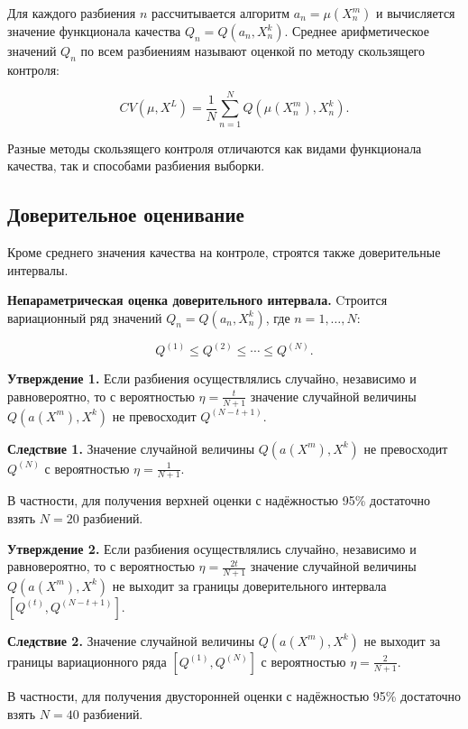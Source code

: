 Для каждого разбиения $n$ рассчитывается алгоритм $a_n = \mu(X^m_n)$ и вычисляется значение функционала качества $Q_n = Q(a_n, X^k_n)$. Среднее арифметическое значений $Q_n$ по всем разбиениям называют оценкой по методу скользящего контроля:

\[
CV(\mu, X^L) = \frac{1}{N} \sum_{n=1}^N Q(\mu(X^m_n), X^k_n).
\]

Разные методы скользящего контроля отличаются как видами функционала качества, так и способами разбиения выборки.

\subsection{Доверительное оценивание}

Кроме среднего значения качества на контроле, строятся также доверительные интервалы.

\textbf{Непараметрическая оценка доверительного интервала.}
\newline
Cтроится вариационный ряд значений $Q_n = Q(a_n, X^k_n)$, где $n = 1, \ldots, N$:

\[
Q^{(1)} \leq Q^{(2)} \leq \cdots \leq Q^{(N)}.
\]

\textbf{Утверждение 1.} Если разбиения осуществлялись случайно, независимо и равновероятно, то с вероятностью $\eta = \frac{t}{N+1}$ значение случайной величины $Q(a(X^m), X^k)$ не превосходит $Q^{(N-t+1)}$.

\textbf{Следствие 1.} Значение случайной величины $Q(a(X^m), X^k)$ не превосходит $Q^{(N)}$ с вероятностью $\eta = \frac{1}{N+1}$.

В частности, для получения верхней оценки с надёжностью 95\% достаточно взять $N=20$ разбиений.

\textbf{Утверждение 2.} Если разбиения осуществлялись случайно, независимо и равновероятно, то с вероятностью $\eta = \frac{2t}{N+1}$ значение случайной величины $Q(a(X^m), X^k)$ не выходит за границы доверительного интервала $\left[ Q^{(t)}, Q^{(N-t+1)} \right]$.

\textbf{Следствие 2.} Значение случайной величины $Q(a(X^m), X^k)$ не выходит за границы вариационного ряда $\left[ Q^{(1)}, Q^{(N)} \right]$ с вероятностью $\eta = \frac{2}{N+1}$.

В частности, для получения двусторонней оценки с надёжностью 95\% достаточно взять $N=40$ разбиений.

